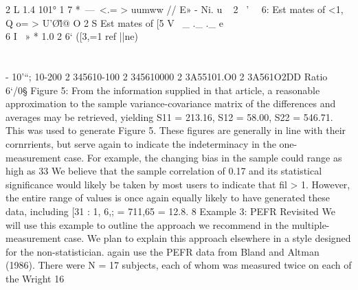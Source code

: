 2 L 1.4
101° 1 7 *~—\
<.= > uumww
//
E»
- Ni. u ~
2 \ '
\
\
6:
Est mates of <1,
Q
o= > U'\O\~l@ O
2 S
Est mates of [5
V \ _ ._
._ e \
\
\\ 6
I \ » * 1.0
2 6‘ ([3,=1 ref ||ne) \\
\\\\ -
10'“;
10-200 2 345610-100 2 345610000 2 3A55101.O0 2 3A561O2DD
Ratio 6‘/0§
Figure 5:
From the information supplied in that article, a reasonable approximation to the
sample variance-covariance matrix of the differences and averages may be retrieved,
yielding S11 = 213.16, S12 = 58.00, S22 = 546.71. This was used to generate Figure 5.
These ﬁgures are generally in line with their cornrrients, but serve again to indicate the
indeterminacy in the one-measurement case. For example, the changing bias in the
sample could range as high as 33%
We believe that the sample correlation of 0.17 and its statistical signiﬁcance would
likely be taken by most users to indicate that ﬁl > 1. However, the entire range of
values is once again equally likely to have generated these data, including [31 : 1,
6,; = 711,65 = 12.8.
8 Example 3: PEFR Revisited
We will use this example to outline the approach we recommend in the multiple-
measurement case. We plan to explain this approach elsewhere in a style designed for
the non-statistician. \Ve again use the PEFR data from Bland and Altman (1986).
There were N = 17 subjects, each of whom was measured twice on each of the Wright
16



